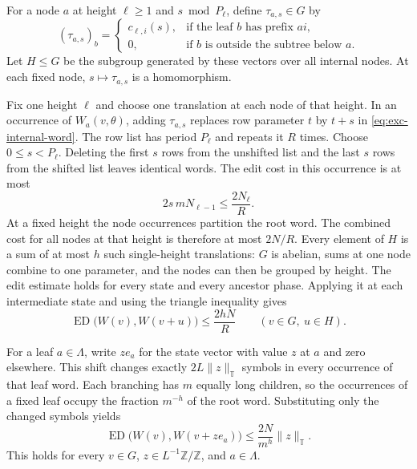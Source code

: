 For a node $a$ at height $\ell\ge1$ and $s\bmod P_\ell$, define
$\tau_{a,s}\in G$ by
\[
 (\tau_{a,s})_b=
 \begin{cases}
 c_{\ell,i}(s),&\text{if the leaf $b$ has prefix $ai$},\\
 0,&\text{if $b$ is outside the subtree below $a$}.
 \end{cases}
\]
Let $H\le G$ be the subgroup generated by these vectors over all internal
nodes.  At each fixed node, $s\mapsto\tau_{a,s}$ is a homomorphism.

Fix one height $\ell$ and choose one translation at each node of that
height.  In an occurrence of $W_a(v,\theta)$, adding $\tau_{a,s}$ replaces
row parameter $t$ by $t+s$ in \eqref{eq:exc-internal-word}.  The row list
has period $P_\ell$ and repeats it $R$ times.  Choose $0\le s<P_\ell$.
Deleting the first $s$ rows from the unshifted list and the last $s$ rows
from the shifted list leaves identical words.  The edit cost in this
occurrence is at most
\[
 2s\,mN_{\ell-1}\le \frac{2N_\ell}{R}.
\]
At a fixed height the node occurrences partition the root word.  The
combined cost for all nodes at that height is therefore at most $2N/R$.
Every element of $H$ is a sum of at most $h$ such single-height
translations: $G$ is abelian, sums at one node combine to one parameter,
and the nodes can then be grouped by height.  The edit estimate holds for
every state and every ancestor phase.  Applying it at each intermediate
state and using the triangle inequality gives
\begin{equation}\label{eq:exc-cheap-subgroup}
 \operatorname{ED}\bigl(W(v),W(v+u)\bigr)
 \le\frac{2hN}{R}
 \qquad(v\in G,\ u\in H).
\end{equation}

For a leaf $a\in\Lambda$, write $ze_a$ for the state vector with value $z$
at $a$ and zero elsewhere. This shift changes exactly $2L\|z\|_{\mathbb T}$ symbols in every occurrence
of that leaf word.  Each branching has $m$ equally long children, so the
occurrences of a fixed leaf occupy the fraction $m^{-h}$ of the root word.
Substituting only the changed symbols yields
\begin{equation}\label{eq:exc-cheap-coordinate}
 \operatorname{ED}\bigl(W(v),W(v+ze_a)\bigr)
 \le\frac{2N}{m^h}\|z\|_{\mathbb T}.
\end{equation}
This holds for every $v\in G$, $z\in L^{-1}\mathbb Z/\mathbb Z$, and
$a\in\Lambda$.

